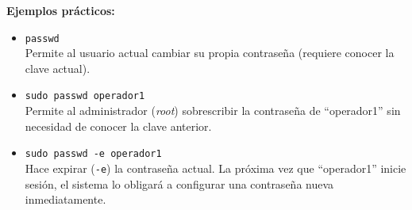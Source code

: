 \documentclass[11pt, a4paper]{article}
\begin{document}
\textbf{Ejemplos prácticos:}
\begin{itemize}
    \item \texttt{passwd} \\
    Permite al usuario actual cambiar su propia contraseña (requiere conocer la clave actual).
    \item \texttt{sudo passwd operador1} \\
    Permite al administrador (\textit{root}) sobrescribir la contraseña de ``operador1'' sin necesidad de conocer la clave anterior.
    \item \texttt{sudo passwd -e operador1} \\
    Hace expirar (\texttt{-e}) la contraseña actual. La próxima vez que ``operador1'' inicie sesión, el sistema lo obligará a configurar una contraseña nueva inmediatamente.
\end{itemize}
\end{document}
